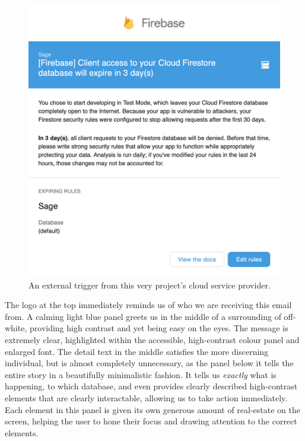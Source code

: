 \begin{figure}[h]
    \begin{center}
        \includegraphics[scale=0.3]{images/firebase_cue.png}
    \end{center}
    \caption{An external trigger from this very project's cloud service provider.}
    \label{fig:firebase_cue}
\end{figure}

The logo at the top immediately reminds us of who we are receiving this email from. A calming light blue panel greets us in the middle of a surrounding of off-white, providing high contrast and yet being easy on the eyes. The message is extremely clear, highlighted within the accessible, high-contrast colour panel and enlarged font.  The detail text in the middle satisfies the more discerning individual, but is almost completely unnecessary, as the panel below it tells the entire story in a beautifully minimalistic fashion. It tells us \textit{exactly} what is happening, to which database, and even provides clearly described high-contrast elements that are clearly interactable, allowing us to take action immediately. Each element in this panel is given its own generous amount of real-estate on the screen, helping the user to hone their focus and drawing attention to the correct elements.

